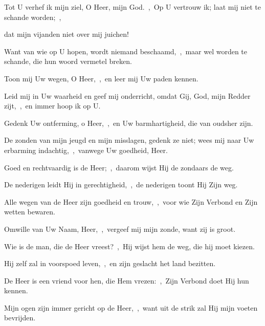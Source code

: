 \documentclass[12pt,twoside,a5paper]{article}
\begin{document}
\begin{halfparskip}
  Tot U verhef ik mijn ziel, O Heer, mijn God.~\sep\ Op U vertrouw ik; laat mij niet te schande worden;~\sep


  dat mijn vijanden niet over mij juichen!

  Want van wie op U hopen, wordt niemand beschaamd,~\sep\ maar wel worden te schande, die hun woord vermetel breken.

  Toon mij Uw wegen, O Heer,~\sep\ en leer mij Uw paden kennen.

  Leid mij in Uw waarheid en geef mij onderricht, omdat Gij, God, mijn Redder zijt,~\sep\ en immer hoop ik op U.

  Gedenk Uw ontferming, o Heer,~\sep\ en Uw barmhartigheid, die van oudsher zijn.

  De zonden van mijn jeugd en mijn misslagen, gedenk ze niet; wees mij naar Uw erbarming indachtig,~\sep\ vanwege Uw goedheid, Heer.
\end{halfparskip}


\begin{halfparskip}
  Goed en rechtvaardig is de Heer;~\sep\ daarom wijst Hij de zondaars de weg.

  De nederigen leidt Hij in gerechtigheid,~\sep\ de nederigen toont Hij Zijn weg.

  Alle wegen van de Heer zijn goedheid en trouw,~\sep\ voor wie Zijn Verbond en Zijn wetten bewaren.

  Omwille van Uw Naam, Heer,~\sep\ vergeef mij mijn zonde, want zij is groot.

  Wie is de man, die de Heer vreest?~\sep\ Hij wijst hem de weg, die hij moet kiezen.

  Hij zelf zal in voorspoed leven,~\sep\ en zijn geslacht het land bezitten.

  De Heer is een vriend voor hen, die Hem vrezen:~\sep\ Zijn Verbond doet Hij hun kennen.

  Mijn ogen zijn immer gericht op de Heer,~\sep\ want uit de strik zal Hij mijn voeten bevrijden.
\end{halfparskip}

\end{document}
